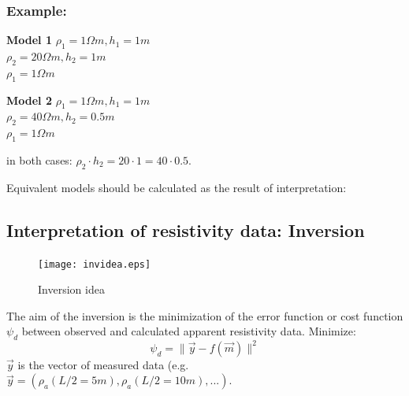 \subsubsection*{Example:}
\begin{minipage}{0.45\textwidth}
\begin{center}
\textbf{Model 1}
$\rho_1=1\Omega m, h_1=1m$\\
$\rho_2=20\Omega m, h_2=1m$\\
$\rho_1=1\Omega m$\\
\end{center}
\end{minipage}
\begin{minipage}{0.45\textwidth}
\begin{center}
\textbf{Model 2}
$\rho_1=1\Omega m, h_1=1m$\\
$\rho_2=40\Omega m, h_2=0.5m$\\
$\rho_1=1\Omega m$\\
\end{center}
\end{minipage}
in both cases: $\rho_2\cdot h_2=20\cdot 1=40\cdot 0.5$.

Equivalent models should be calculated as the result of interpretation:


\subsection{Interpretation of resistivity data: Inversion}

\begin{figure}[H]
\begin{center}
\texttt{[image: invidea.eps]}
\caption{Inversion idea}
\label{fig:inv01}
\end{center}
\end{figure}
The aim of the inversion is the minimization of the error function or cost function $\psi_d$ between observed and calculated apparent resistivity data. Minimize:
\begin{equation}
\psi_d=\|\vec{y}-f(\vec{m})\|^2
\end{equation}
$\vec{y}$ is the vector of measured data (e.g. $\vec{y}=(\rho_a(L/2=5m),\rho_a(L/2=10m),...)$.

